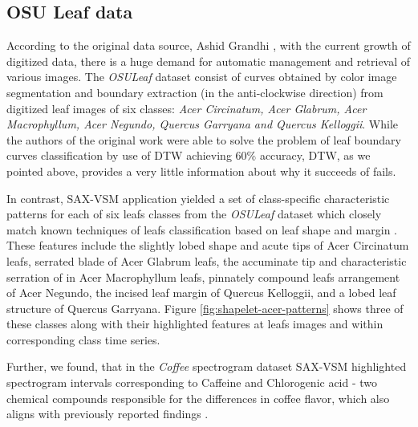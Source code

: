 \documentclass{llncs}
\begin{document}
\subsection{OSU Leaf data}
According to the original data source, Ashid Grandhi \cite{osuleaf}, with the current growth of
digitized data, there is a huge demand for automatic management and retrieval of various images. The
\textit{OSULeaf} dataset consist of curves obtained by color image segmentation and boundary
extraction (in the anti-clockwise direction) from digitized leaf images of six classes: \textit{Acer
Circinatum, Acer Glabrum, Acer Macrophyllum, Acer Negundo, Quercus Garryana and Quercus Kelloggii}.
While the authors of the original work were able to solve the problem of leaf boundary curves
classification by use of DTW achieving 60\% accuracy, DTW, as we pointed above, provides a very
little information about why it succeeds of fails. 

In contrast, SAX-VSM application yielded a set of class-specific characteristic patterns for each of
six leafs classes from the \textit{OSULeaf} dataset which closely match known techniques of leafs
classification based on leaf shape and margin \cite{dirr}. These features include the slightly
lobed shape and acute tips of Acer Circinatum leafs, serrated blade of Acer Glabrum leafs,
the accuminate tip and characteristic serration of in Acer Macrophyllum leafs, pinnately compound
leafs arrangement of Acer Negundo, the incised leaf margin of Quercus Kelloggii, and a lobed leaf
structure of Quercus Garryana. Figure \ref{fig:shapelet-acer-patterns} shows three of these classes
along with their highlighted features at leafs images and within corresponding class time series.

Further, we found, that in the \textit{Coffee} spectrogram dataset SAX-VSM highlighted spectrogram
intervals corresponding to Caffeine and Chlorogenic acid - two chemical compounds responsible for
the differences in coffee flavor, which also aligns with previously reported findings \cite{coffee}.
\end{document}
